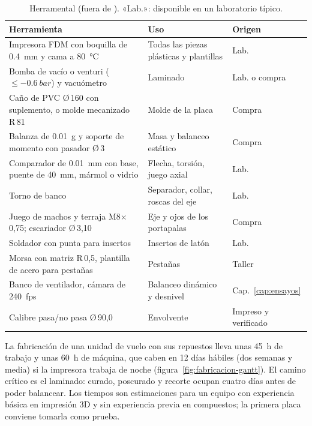 \begin{table}[H]
\centering\small
\caption{Herramental (fuera de ). «Lab.»: disponible en un laboratorio típico.}
\label{tab:fabricacion-herramental}
\begin{tabularx}{\textwidth}{@{}Y>{\raggedright\arraybackslash}p{3.8cm}l@{}}
\toprule
\textbf{Herramienta} & \textbf{Uso} & \textbf{Origen}\\\midrule
Impresora FDM con boquilla de \SI{0.4}{mm} y cama a \SI{80}{\celsius} & Todas las piezas plásticas y plantillas & Lab.\\
Bomba de vacío o venturi ($\le\SI{-0.6}{bar}$) y vacuómetro & Laminado & Lab. o compra\\
Caño de PVC Ø\,160 con suplemento, o molde mecanizado R\,81 & Molde de la placa & Compra\\
Balanza de \SI{0.01}{g} y soporte de momento con pasador Ø\,3 & Masa y balanceo estático & Compra\\
Comparador de \SI{0.01}{mm} con base, puente de \SI{40}{mm}, mármol o vidrio & Flecha, torsión, juego axial & Lab.\\
Torno de banco & Separador, collar, roscas del eje & Lab.\\
Juego de machos y terraja M8$\times$0,75; escariador Ø\,3,10 & Eje y ojos de los portapalas & Compra\\
Soldador con punta para insertos & Insertos de latón & Lab.\\
Morsa con matriz R\,0,5, plantilla de acero para pestañas & Pestañas & Taller\\
Banco de ventilador, cámara de \SI{240}{fps} & Balanceo dinámico y desnivel & Cap.~\ref{cap:ensayos}\\
Calibre pasa/no pasa Ø\,90,0 & Envolvente & Impreso y verificado\\
\bottomrule
\end{tabularx}
\end{table}

La fabricación de una unidad de vuelo con sus repuestos lleva unas \SI{45}{h} de trabajo y
unas \SI{60}{h} de máquina, que caben en 12 días hábiles (dos semanas y media) si la
impresora trabaja de noche (figura~\ref{fig:fabricacion-gantt}). El camino crítico es el laminado: curado,
poscurado y recorte ocupan cuatro días antes de poder balancear. Los tiempos son
estimaciones para un equipo con experiencia básica en impresión 3D y sin experiencia previa
en compuestos; la primera placa conviene tomarla como prueba.

